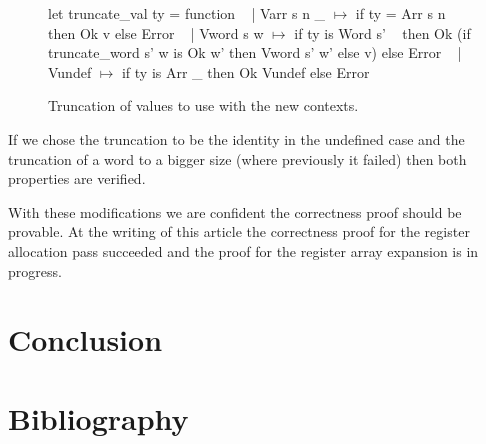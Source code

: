 \documentclass{article}
\begin{document}
\begin{figure}[t]
\obeylines\obeyspaces\ttfamily%
let truncate\_val ty = function
~ | Varr s n \_ \(\mapsto\) if ty = Arr s n then Ok v else Error
~ | Vword s w  \(\mapsto\) if ty is Word s'
~   then Ok (if truncate\_word s' w is Ok w' then Vword s' w' else v) else Error
~ | Vundef     \(\mapsto\) if ty is Arr \_ then Ok Vundef else Error
\normalfont%
\caption{Truncation of values to use with the new contexts.}
\end{figure}

If we chose the truncation to be the identity in the undefined case and the
truncation of a word to a bigger size (where previously it failed) then both
properties are verified.

\medskip

With these modifications we are confident the correctness proof should be
provable. At the writing of this article the correctness proof for the register
allocation pass succeeded and the proof for the register array expansion is in
progress.

\section{Conclusion}\label{sec:ccl}

\section{Bibliography}


\end{document}
